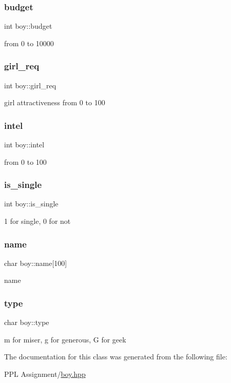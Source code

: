 \subsubsection{\texorpdfstring{budget}{budget}}
{\footnotesize\ttfamily int boy\+::budget}

from 0 to 10000 \mbox{\label{classboy_a4010ffd0cd277dc18b46dfc02deb5373}} 
\subsubsection{\texorpdfstring{girl\+\_\+req}{girl\_req}}
{\footnotesize\ttfamily int boy\+::girl\+\_\+req}

girl attractiveness from 0 to 100 \mbox{\label{classboy_a71d1abd867065c974a0a5fc82816251e}} 
\subsubsection{\texorpdfstring{intel}{intel}}
{\footnotesize\ttfamily int boy\+::intel}

from 0 to 100 \mbox{\label{classboy_a41970db5115b231d0c631b072319e44d}} 
\subsubsection{\texorpdfstring{is\+\_\+single}{is\_single}}
{\footnotesize\ttfamily int boy\+::is\+\_\+single}

1 for single, 0 for not \mbox{\label{classboy_a703fa58417037fd55aaa45942fb550a5}} 
\subsubsection{\texorpdfstring{name}{name}}
{\footnotesize\ttfamily char boy\+::name\mbox{[}100\mbox{]}}

name \mbox{\label{classboy_a306008ea0ed9d913e5479fd7e6029291}} 
\subsubsection{\texorpdfstring{type}{type}}
{\footnotesize\ttfamily char boy\+::type}

\textquotesingle{}m\textquotesingle{} for miser, \textquotesingle{}g\textquotesingle{} for generous, \textquotesingle{}G\textquotesingle{} for geek 

The documentation for this class was generated from the following file\+:\begin{DoxyCompactItemize}
\item 
P\+P\+L Assignment/\hyperlink{boy_8hpp}{boy.\+hpp}\end{DoxyCompactItemize}

